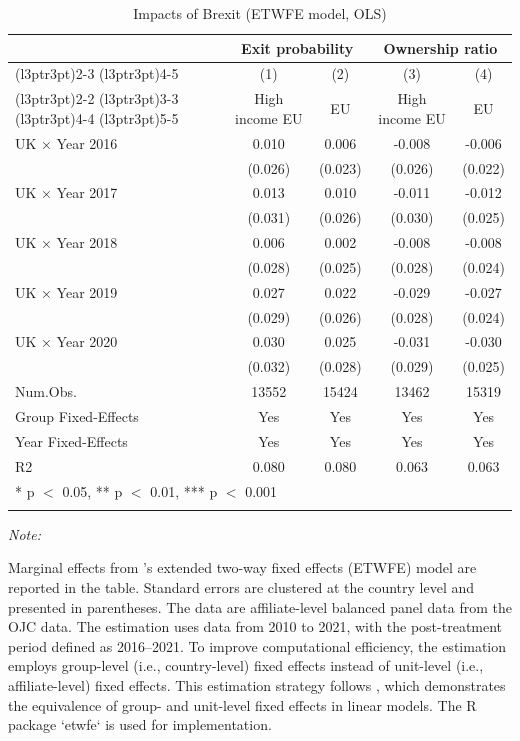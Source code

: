 \begin{table}[ht]
\centering
\caption{\label{tab:Table-ETWFE-OLS}Impacts of Brexit (ETWFE model, OLS)}
\centering
\begin{threeparttable}
\begin{tabular}[t]{lcccc}
\toprule
\multicolumn{1}{c}{ } & \multicolumn{2}{c}{Exit probability} & \multicolumn{2}{c}{Ownership ratio} \\
\cmidrule(l{3pt}r{3pt}){2-3} \cmidrule(l{3pt}r{3pt}){4-5}
\multicolumn{1}{c}{ } & \multicolumn{1}{c}{(1)} & \multicolumn{1}{c}{(2)} & \multicolumn{1}{c}{(3)} & \multicolumn{1}{c}{(4)} \\
\cmidrule(l{3pt}r{3pt}){2-2} \cmidrule(l{3pt}r{3pt}){3-3} \cmidrule(l{3pt}r{3pt}){4-4} \cmidrule(l{3pt}r{3pt}){5-5}
  & High income EU & EU & High income EU  & EU \\
\midrule
UK × Year 2016 & 0.010 & 0.006 & -0.008 & -0.006\\
 & (0.026) & (0.023) & (0.026) & (0.022)\\
UK × Year 2017 & 0.013 & 0.010 & -0.011 & -0.012\\
 & (0.031) & (0.026) & (0.030) & (0.025)\\
UK × Year 2018 & 0.006 & 0.002 & -0.008 & -0.008\\
 & (0.028) & (0.025) & (0.028) & (0.024)\\
UK × Year 2019 & 0.027 & 0.022 & -0.029 & -0.027\\
 & (0.029) & (0.026) & (0.028) & (0.024)\\
UK × Year 2020 & 0.030 & 0.025 & -0.031 & -0.030\\
 & (0.032) & (0.028) & (0.029) & (0.025)\\
\midrule
Num.Obs. & 13552 & 15424 & 13462 & 15319\\
Group Fixed-Effects & Yes & Yes & Yes & Yes\\
Year Fixed-Effects & Yes & Yes & Yes & Yes\\
R2 & 0.080 & 0.080 & 0.063 & 0.063\\
\bottomrule
\multicolumn{5}{l}{\rule{0pt}{1em}* p $<$ 0.05, ** p $<$ 0.01, *** p $<$ 0.001}\\
\multicolumn{5}{l}{\rule{0pt}{1em}}\\
\end{tabular}
\begin{tablenotes}
\item \textit{Note: } 
\item Marginal effects from \cite{wooldridge2021two}'s extended two-way fixed effects (ETWFE) model are reported in the table. Standard errors are clustered at the country level and presented in parentheses. The data are affiliate-level balanced panel data from the OJC data. The estimation uses data from 2010 to 2021, with the post-treatment period defined as 2016–2021. To improve computational efficiency, the estimation employs group-level (i.e., country-level) fixed effects instead of unit-level (i.e., affiliate-level) fixed effects. This estimation strategy follows \cite{wooldridge2021two}, which demonstrates the equivalence of group- and unit-level fixed effects in linear models. The R package `etwfe` is used for implementation.

\end{tablenotes}
\end{threeparttable}
\end{table}
